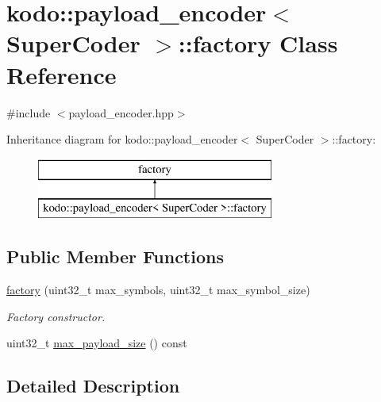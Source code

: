 \hypertarget{classkodo_1_1payload__encoder_1_1factory}{\section{kodo\-:\-:payload\-\_\-encoder$<$ Super\-Coder $>$\-:\-:factory Class Reference}
\label{classkodo_1_1payload__encoder_1_1factory}
}


{\ttfamily \#include $<$payload\-\_\-encoder.\-hpp$>$}

Inheritance diagram for kodo\-:\-:payload\-\_\-encoder$<$ Super\-Coder $>$\-:\-:factory\-:\begin{figure}[H]
\begin{center}
\leavevmode
\includegraphics[height=2.000000cm]{classkodo_1_1payload__encoder_1_1factory}
\end{center}
\end{figure}
\subsection*{Public Member Functions}
\begin{DoxyCompactItemize}
\item 
\hyperlink{classkodo_1_1payload__encoder_1_1factory_a56ceb73b2a993b699ec1f80a35d42208}{factory} (uint32\-\_\-t max\-\_\-symbols, uint32\-\_\-t max\-\_\-symbol\-\_\-size)
\begin{DoxyCompactList}\small\item\em Factory constructor. \end{DoxyCompactList}\item 
uint32\-\_\-t \hyperlink{classkodo_1_1payload__encoder_1_1factory_ab77bf46a4e078b3cb555d303711a72a1}{max\-\_\-payload\-\_\-size} () const 
\begin{DoxyCompactList}\small\item\em \end{DoxyCompactList}\end{DoxyCompactItemize}


\subsection{Detailed Description}
